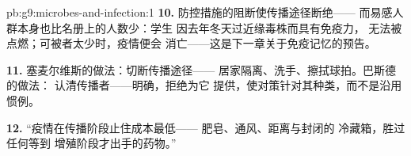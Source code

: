 \begin{solution}{pb:g9:microbes-and-infection:1}
\textbf{10.} 防控措施的阻断使传播途径断绝——
而易感人群本身也比名册上的人数少：学生
因去年冬天过近缘毒株而具有免疫力，
无法被点燃；可被者太少时，疫情便会
消亡——这是下一章关于免疫记忆的预告。

\textbf{11.} 塞麦尔维斯的做法：切断传播途径——
居家隔离、洗手、擦拭球拍。巴斯德的做法：
认清传播者——明确，拒绝为它
提供，使对策针对其种类，而不是沿用
惯例。

\textbf{12.} “疫情在传播阶段止住成本最低——
肥皂、通风、距离与封闭的
冷藏箱，胜过任何等到
增殖阶段才出手的药物。”
\end{solution}
